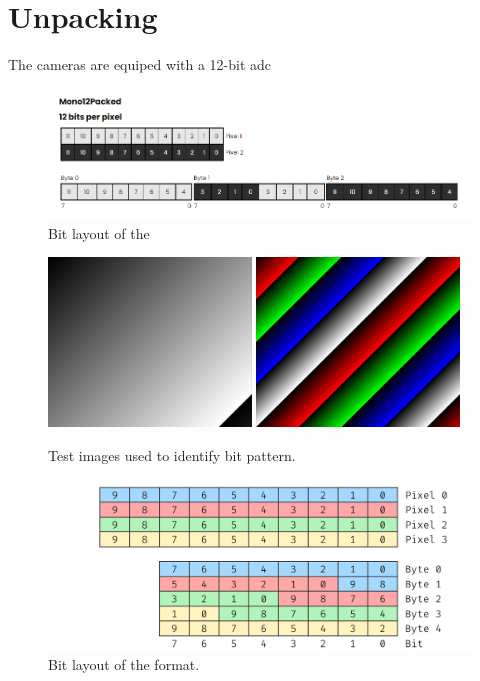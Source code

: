\section {Unpacking}
\label{sec:unpacking}
The \lucid cameras are equiped with a 12-bit \gls{adc}

\begin{figure}
    \centering
    \includegraphics[width=\textwidth]{figures/polarized_image/Mono12Packed.png}
    \caption{Bit layout of the \cite{fisherRe15406LUT2023}}
    \label{fig:mono12packed}
\end{figure}




\begin{figure}[H]
    \centering
    \includegraphics[width=0.48\textwidth]{figures/unpacking/test_pattern0.jpg}
    \includegraphics[width=0.48\textwidth]{figures/unpacking/test_pattern2.jpg}
    \caption{Test images used to identify bit pattern.}
\end{figure}

\begin{figure}[H]
    \centering
    \includegraphics[width=\textwidth]{figures/unpacking/layout_10p.pdf}
    \caption{Bit layout of the  format.}
\end{figure}

